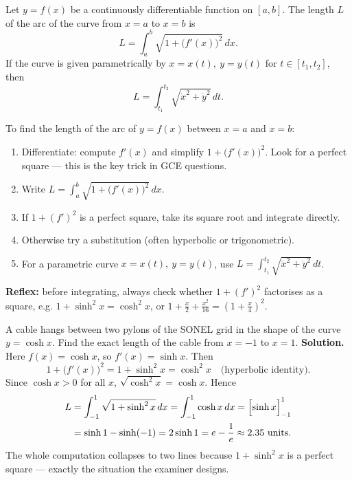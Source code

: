 \documentclass[11pt]{article}
\newcommand{\cle}[1]{{\popxbold\color{popdark}#1}}
\newcounter{popsec}
\newcounter{popsub}
\newcommand{\courssub}[1]{%
  \stepcounter{popsub}%
  \par\vspace{9pt}\noindent{\popxbold\fontsize{11.5}{13}\selectfont\color{popink}{\color{poporange}\thepopsec.\thepopsub}\hspace{6pt}#1}\par\nopagebreak\vspace{4pt}
}
\begin{document}
\courssub{Arc Length of a Curve}

\begin{definition}
Let $y=f(x)$ be a continuously differentiable function on $[a,b]$. The length $L$ of the arc of the curve from $x=a$ to $x=b$ is
\[
L = \int_a^b \sqrt{1+\bigl(f'(x)\bigr)^2}\,dx.
\]
If the curve is given parametrically by $x=x(t),\ y=y(t)$ for $t\in[t_1,t_2]$, then
\[
L = \int_{t_1}^{t_2} \sqrt{\dot{x}^2+\dot{y}^2}\,dt.
\]
\end{definition}

\begin{methode}[Arc length of $y=f(x)$]
To find the length of the arc of $y=f(x)$ between $x=a$ and $x=b$:
\begin{enumerate}
\item Differentiate: compute $f'(x)$ and simplify $1+\bigl(f'(x)\bigr)^2$. Look for a \cle{perfect square} — this is the key trick in GCE questions.
\item Write $L=\displaystyle\int_a^b\sqrt{1+\bigl(f'(x)\bigr)^2}\,dx$.
\item If $1+(f')^2$ is a perfect square, take its square root and integrate directly.
\item Otherwise try a substitution (often hyperbolic or trigonometric).
\item For a parametric curve $x=x(t),\ y=y(t)$, use $L=\displaystyle\int_{t_1}^{t_2}\sqrt{\dot{x}^2+\dot{y}^2}\,dt$.
\end{enumerate}
\textbf{Reflex:} before integrating, always check whether $1+(f')^2$ factorises as a square, e.g. $1+\sinh^2x=\cosh^2x$, or $1+\frac{x}{2}+\frac{x^2}{16}=\left(1+\frac{x}{4}\right)^2$.
\end{methode}

\begin{exoresolu}
A cable hangs between two pylons of the SONEL grid in the shape of the curve $y=\cosh x$. Find the exact length of the cable from $x=-1$ to $x=1$.
\tcblower
\textbf{Solution.} Here $f(x)=\cosh x$, so $f'(x)=\sinh x$. Then
\[ 1+\bigl(f'(x)\bigr)^2 = 1+\sinh^2 x = \cosh^2 x \quad\text{(hyperbolic identity)}. \]
Since $\cosh x>0$ for all $x$, $\sqrt{\cosh^2 x}=\cosh x$. Hence
\begin{align*}
L&=\int_{-1}^{1}\sqrt{1+\sinh^2 x}\,dx=\int_{-1}^{1}\cosh x\,dx
=\Bigl[\sinh x\Bigr]_{-1}^{1}\\
&=\sinh 1-\sinh(-1)=2\sinh 1 = e-\frac{1}{e}\approx 2.35 \text{ units}.
\end{align*}
The whole computation collapses to two lines because $1+\sinh^2x$ is a perfect square — exactly the situation the examiner designs.
\end{exoresolu}
\end{document}
